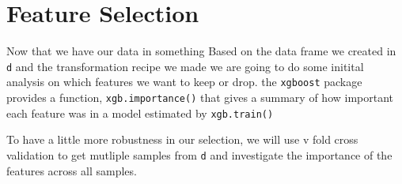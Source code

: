 \documentclass[]{book}
\newenvironment{Shaded}{\begin{snugshade}}{\end{snugshade}}
\newcommand{\KeywordTok}[1]{\textcolor[rgb]{0.13,0.29,0.53}{\textbf{#1}}}
\newcommand{\DataTypeTok}[1]{\textcolor[rgb]{0.13,0.29,0.53}{#1}}
\newcommand{\DecValTok}[1]{\textcolor[rgb]{0.00,0.00,0.81}{#1}}
\newcommand{\StringTok}[1]{\textcolor[rgb]{0.31,0.60,0.02}{#1}}
\newcommand{\ControlFlowTok}[1]{\textcolor[rgb]{0.13,0.29,0.53}{\textbf{#1}}}
\newcommand{\OperatorTok}[1]{\textcolor[rgb]{0.81,0.36,0.00}{\textbf{#1}}}
\newcommand{\NormalTok}[1]{#1}
\theoremstyle{definition}
\theoremstyle{definition}
\theoremstyle{definition}
\theoremstyle{remark}
\begin{document}
\chapter{Feature Selection}\label{feature-selection}

Now that we have our data in something Based on the data frame we
created in \texttt{d} and the transformation recipe we made we are going
to do some initital analysis on which features we want to keep or drop.
the \texttt{xgboost} package provides a function,
\texttt{xgb.importance()} that gives a summary of how important each
feature was in a model estimated by \texttt{xgb.train()}

To have a little more robustness in our selection, we will use v fold
cross validation to get mutliple samples from \texttt{d} and investigate
the importance of the features across all samples.

\begin{Shaded}
\end{Shaded}
\end{document}
